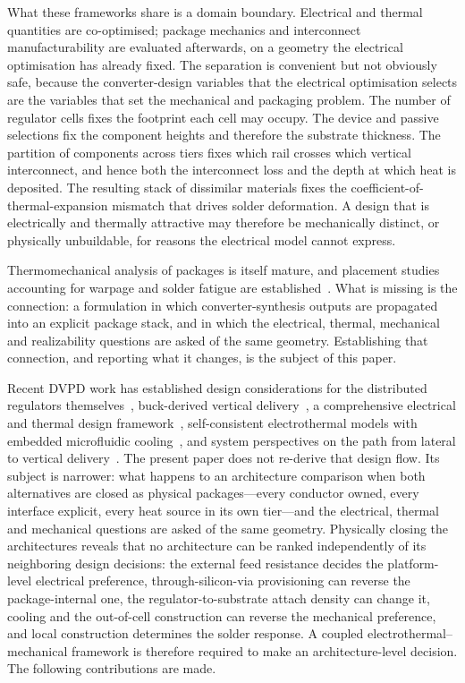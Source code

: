 \documentclass[journal]{IEEEtran}
\begin{document}
What these frameworks share is a domain boundary. Electrical and thermal quantities are
co-optimised; package mechanics and interconnect manufacturability are evaluated afterwards,
on a geometry the electrical optimisation has already fixed. The separation is convenient
but not obviously safe, because the converter-design variables that the electrical
optimisation selects are the variables that set the mechanical and packaging problem. The
number of regulator cells fixes the footprint each cell may occupy. The device and passive
selections fix the component heights and therefore the substrate thickness. The partition of
components across tiers fixes which rail crosses which vertical interconnect, and hence both
the interconnect loss and the depth at which heat is deposited. The resulting stack of
dissimilar materials fixes the coefficient-of-thermal-expansion mismatch that drives solder
deformation. A design that is electrically and thermally attractive may therefore be
mechanically distinct, or physically unbuildable, for reasons the electrical model cannot
express.

Thermomechanical analysis of packages is itself mature, and placement studies accounting for
warpage and solder fatigue are established~\cite{Syed2004,Schubert2003}. What is missing is
the connection: a formulation in which converter-synthesis outputs are propagated into an
explicit package stack, and in which the electrical, thermal, mechanical and realizability
questions are asked of the same geometry. Establishing that connection, and reporting what
it changes, is the subject of this paper.

Recent DVPD work has established design considerations for the distributed
regulators themselves~\cite{ISCAS2024DVPD}, buck-derived vertical delivery~\cite{Sriharini_ECTC_24},
a comprehensive electrical and thermal design framework~\cite{Krishnakumar2026DVPD},
self-consistent electrothermal models with embedded microfluidic
cooling~\cite{Choi2024ITherm,Choi2025SelfConsistent}, and system perspectives on the path from
lateral to vertical delivery~\cite{VPD2023Architectures,Ye2026TenKiloAmp,Swaminathan2026IVPDReview}.
The present paper does not re-derive that design flow. Its subject is narrower: what happens to
an architecture comparison when both alternatives are closed as physical packages---every
conductor owned, every interface explicit, every heat source in its own tier---and the
electrical, thermal and mechanical questions are asked of the same geometry. Physically closing the architectures reveals that no architecture can be ranked independently of its neighboring design decisions: the external feed resistance decides the platform-level electrical preference, through-silicon-via provisioning can reverse the package-internal one, the regulator-to-substrate attach density can change it, cooling and the out-of-cell construction can reverse the mechanical preference, and local construction determines the solder response. A coupled electrothermal--mechanical framework is therefore required to make an architecture-level decision.
The following contributions are made.
\end{document}
